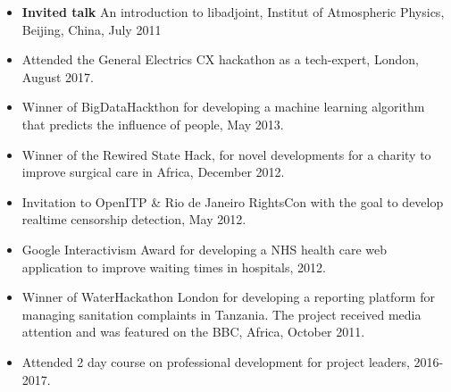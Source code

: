 \documentclass[11pt]{article}
\newenvironment{outerlist}[1][\enskip\textbullet]
        {\begin{itemize}[ #1]}{\end{itemize}}
\begin{document}
\begin{outerlist}
\item[] \textbf{Invited talk} An introduction to libadjoint, Institut of Atmospheric Physics, Beijing, China, July 2011
\end{outerlist}

\begin{outerlist}
\item[] Attended the General Electrics CX hackathon as a tech-expert, London, August 2017.
\item[] Winner of BigDataHackthon for developing a machine learning algorithm that predicts the influence of people, May 2013.
\item[] Winner of the Rewired State Hack, for novel developments for a charity to improve surgical care in Africa, December 2012.
\item[] Invitation to OpenITP \& Rio de Janeiro RightsCon with the goal to develop realtime censorship detection, May 2012.
\item[] Google Interactivism Award for developing a NHS health care web application to improve waiting times in hospitals, 2012.
\item[] Winner of WaterHackathon London for developing a reporting platform for managing sanitation complaints in Tanzania. The project received media attention and was featured on the BBC, Africa, October 2011.
\end{outerlist}

\begin{outerlist}
    \item[] Attended 2 day course on professional development for project leaders, 2016-2017.
\end{outerlist}
\end{document}
